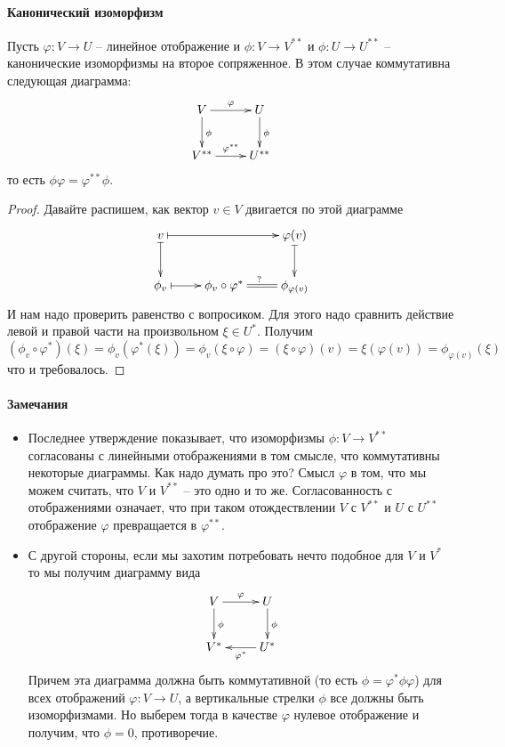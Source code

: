 \paragraph{Канонический изоморфизм}

\begin{claim}
\label{claim::CanonicalIsomorphism}
Пусть $\varphi\colon V\to U$ -- линейное отображение и $\phi\colon V\to V^{**}$ и $\phi\colon U\to U^{**}$ -- канонические изоморфизмы на второе сопряженное.
В этом случае коммутативна следующая диаграмма:
\[
\xymatrix{
	{V}\ar[r]^{\varphi}\ar[d]^{\phi}&{U}\ar[d]^{\phi}\\
	{V^{**}}\ar[r]^{\varphi^{**}}&{U^{**}}
}
\]
то есть $\phi \varphi = \varphi^{**}\phi$.
\end{claim}
\begin{proof}
Давайте распишем, как вектор $v\in V$ двигается по этой диаграмме
\[
\xymatrix{
	{v}\ar@{|->}[rr]\ar@{|->}[d]&{}&{\varphi(v)}\ar@{|->}[d]\\
	{\phi_v}\ar@{|->}[r]&{\phi_v\circ \varphi^*}\ar@{=}[r]^{?}&{\phi_{\varphi(v)}}
}
\]
И нам надо проверить равенство с вопросиком.
Для этого надо сравнить действие левой и правой части на произвольном $\xi\in U^*$.
Получим
\[
(\phi_v\circ \varphi^*)(\xi) = \phi_v(\varphi^*(\xi)) = \phi_v(\xi\circ\varphi) = (\xi\circ \varphi) (v) = \xi(\varphi(v)) = \phi_{\varphi(v)}(\xi)
\]
что и требовалось.
\end{proof}

\paragraph{Замечания}

\begin{itemize}
\item Последнее утверждение показывает, что изоморфизмы $\phi\colon V\to V^{**}$ согласованы с линейными отображениями в том смысле, что коммутативны некоторые диаграммы.
Как надо думать про это?
Смысл $\varphi$ в том, что мы можем считать, что $V$ и $V^{**}$ -- это одно и то же.
Согласованность с отображениями означает, что при таком отождествлении $V$ с $V^{**}$ и $U$ с $U^{**}$ отображение $\varphi$ превращается в $\varphi^{**}$.

\item С другой стороны, если мы захотим потребовать нечто подобное для $V$ и $V^*$ то мы получим диаграмму вида
\[
\xymatrix{
	{V}\ar[r]^{\varphi}\ar[d]^{\phi}&{U}\ar[d]^{\phi}\\
	{V^*}&{U^*}\ar[l]^{\varphi^*}
}
\]
Причем эта диаграмма должна быть коммутативной (то есть $\phi = \varphi^*\phi\varphi$) для всех отображений $\varphi\colon V\to U$, а вертикальные стрелки $\phi$ все должны быть изоморфизмами.
Но выберем тогда в качестве $\varphi$ нулевое отображение и получим, что $\phi = 0$, противоречие.
\end{itemize}


